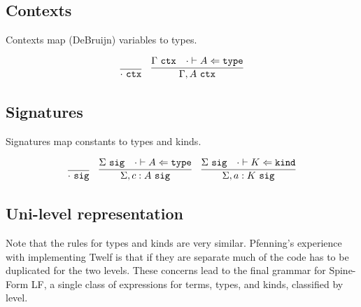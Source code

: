 \documentclass[11pt,twoside]{article}
\begin{document}

\subsection{Contexts}

Contexts map (DeBruijn) variables to types.  

\newcommand{\Ctx}{\ \mathtt{ctx}}
\bigskip 
\framebox{$\Gamma\Ctx$}
\bigskip 

$$
\begin{array}{cc}
\infer{\cdot\Ctx}{} &
\infer{\Gamma,A\Ctx}{\Gamma\Ctx & \CheckTy[\cdot]{A}{\Type}}
\end{array} 
$$


\subsection{Signatures}

Signatures map constants to types and kinds.

\newcommand{\Sig}{\ \mathtt{sig}}
\bigskip 
\framebox{$\Sigma\Sig$}
\bigskip 

$$
\begin{array}{ccc}
\infer{\cdot\Sig}{}&
\infer{\Sigma,c:A\Sig}{\Sigma\Sig & \CheckTy[\cdot]{A}{\Type}}&
\infer{\Sigma,a:K\Sig}{\Sigma\Sig & \CheckTy[\cdot]{K}{\Kind}}
\end{array} 
$$


\subsection{Uni-level representation}

Note that the rules for types and kinds are very similar.
Pfenning's experience with implementing Twelf is that if they
are separate much of the code has to be duplicated for
the two levels.  These concerns lead to the final 
grammar for Spine-Form LF, a single class of expressions for
terms, types, and kinds, classified by level.
\end{document}
